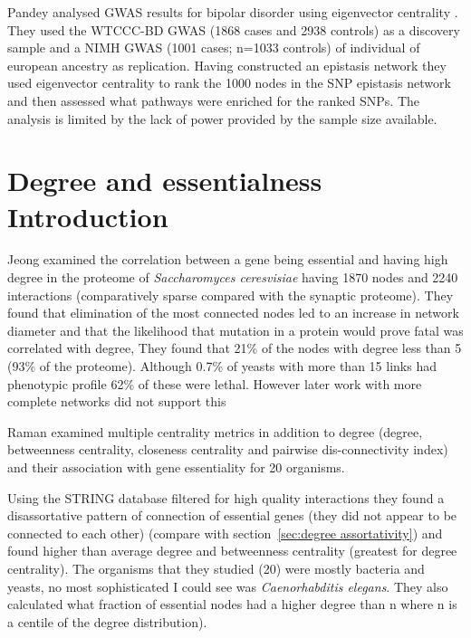 Pandey analysed GWAS results for bipolar disorder using eigenvector centrality \cite{pandey2012epistasis}. They used the WTCCC-BD GWAS (1868 cases and 2938 controls) as a discovery sample and  a NIMH GWAS (1001 cases; n=1033 controls) of individual of european ancestry as replication. Having constructed an epistasis network they used eigenvector centrality to rank the 1000 nodes in the SNP epistasis network and then assessed what pathways were enriched for the ranked SNPs. The analysis is limited by the lack of power provided by the sample size available.

\section{Degree and essentialness Introduction}
\label{sec:Degree and essentialness}
Jeong \cite{jeong2001lethality} examined the correlation between a gene being essential and having high degree in the proteome of \textit{Saccharomyces ceresvisiae} having 1870 nodes and 2240 interactions (comparatively sparse compared with the synaptic proteome). They found that elimination of the most connected nodes led to an increase in network diameter and that the likelihood that mutation in a protein would prove fatal was correlated with degree, They found that 21\% of the nodes with degree less than 5 (93\% of the proteome). Although 0.7\% of yeasts with more than 15 links had phenotypic profile 62\% of these were lethal. However later work with more complete networks did not support this \cite{milenkovic2011dominating} \cite{yu2008high}


Raman \cite{raman2014organisational} examined multiple centrality metrics in addition to degree (degree, betweenness centrality, closeness centrality and pairwise dis-connectivity index) and their association with gene essentiality for 20 organisms.

 Using the STRING database filtered for high quality interactions they found a disassortative  pattern of connection of essential genes (they did not appear to be connected to each other)  (compare with section~\ref{sec:degree assortativity})  and found higher than average degree and betweenness centrality (greatest for degree centrality). The organisms that they studied (20) were mostly bacteria and yeasts, no most sophisticated I could see was \textit{Caenorhabditis elegans}. They also calculated what fraction of essential nodes had a higher degree than n where n is a centile of the degree distribution).

